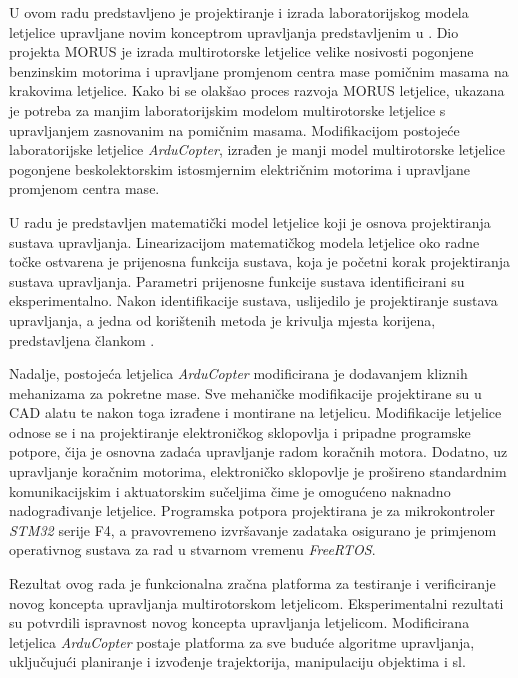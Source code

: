 \documentclass[11pt,a4paper]{article}
\begin{document}
U ovom radu predstavljeno je projektiranje i izrada laboratorijskog modela letjelice upravljane novim konceptrom upravljanja predstavljenim u \cite{haus1}. Dio projekta MORUS je izrada multirotorske letjelice velike nosivosti pogonjene benzinskim motorima i upravljane promjenom centra mase pomičnim masama na krakovima letjelice.
Kako bi se olakšao proces razvoja MORUS letjelice, ukazana je potreba za manjim laboratorijskim modelom multirotorske letjelice s upravljanjem zasnovanim na pomičnim masama. Modifikacijom postojeće laboratorijske letjelice \textit{ArduCopter},
izrađen je manji model multirotorske letjelice pogonjene beskolektorskim istosmjernim električnim motorima i upravljane promjenom centra mase.


\medskip
U radu je predstavljen matematički model letjelice koji je osnova projektiranja sustava upravljanja. Linearizacijom matematičkog modela letjelice oko radne točke ostvarena je prijenosna funkcija sustava, koja je početni korak projektiranja sustava upravljanja. Parametri prijenosne funkcije sustava identificirani su eksperimentalno. Nakon identifikacije sustava, uslijedilo je projektiranje sustava upravljanja, a jedna od korištenih metoda je krivulja mjesta korijena, predstavljena člankom \cite{haus2}.

\medskip

Nadalje, postojeća letjelica \textit{ArduCopter} modificirana je dodavanjem kliznih mehanizama za pokretne mase. Sve mehaničke modifikacije projektirane su u CAD alatu te nakon toga izrađene i montirane na letjelicu. Modifikacije letjelice odnose se i na projektiranje elektroničkog sklopovlja i pripadne programske potpore, čija je osnovna zadaća upravljanje radom koračnih motora. Dodatno, uz upravljanje koračnim motorima, elektroničko sklopovlje je prošireno standardnim komunikacijskim i aktuatorskim sučeljima čime je omogućeno naknadno nadograđivanje letjelice. Programska potpora projektirana je za mikrokontroler \textit{STM32} serije F4, a pravovremeno izvršavanje zadataka osigurano je primjenom operativnog sustava za rad u stvarnom vremenu \textit{FreeRTOS}.


\medskip
Rezultat ovog rada je funkcionalna zračna platforma za testiranje i verificiranje novog koncepta upravljanja multirotorskom letjelicom. Eksperimentalni rezultati su potvrdili ispravnost novog koncepta upravljanja letjelicom. Modificirana letjelica \textit{ArduCopter} postaje platforma za sve buduće algoritme upravljanja, uključujući planiranje i izvođenje trajektorija, manipulaciju objektima i sl.
\end{document}
